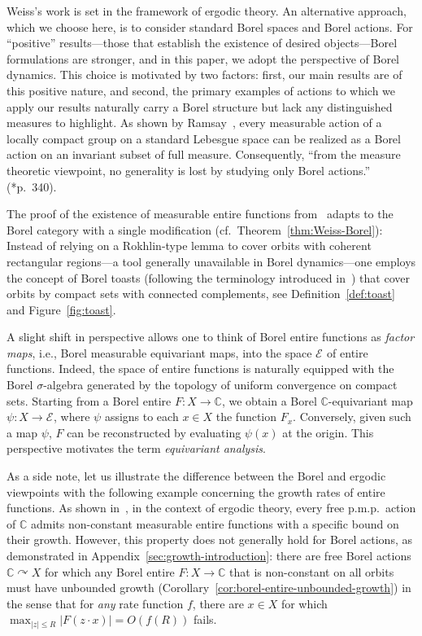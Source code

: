 \documentclass[12pt]{paper}
\numberwithin{equation}{section}
\theoremstyle{plain}
\theoremstyle{definition}
\newcommand{\C}{\mathbb{C}}
\newcommand{\holom}[1][]{\mathcal{E}_{#1}}
\newcommand{\acts}{\curvearrowright}
\begin{document}
Weiss's work is set in the framework of ergodic theory.  An alternative approach, which we choose
here, is to consider standard Borel spaces and Borel actions.  For ``positive'' results---those that
establish the existence of desired objects---Borel formulations are stronger, and in this paper, we
adopt the perspective of Borel dynamics.  This choice is motivated by two factors: first, our main
results are of this positive nature, and second, the primary examples of actions to which we apply
our results naturally carry a Borel structure but lack any distinguished measures to highlight.
As shown by Ramsay~\cite{ramsayMeasurableGroupActions1985}, every measurable action of a locally
compact group on a standard Lebesgue space can be realized as a Borel action on an invariant subset
of full measure. Consequently, ``from the measure theoretic viewpoint, no generality is lost by
studying only Borel actions.'' (\cite{ramsayMeasurableGroupActions1985}*{p.~340}).

The proof of the existence of measurable entire functions from~\cite{MR1422707} adapts to the Borel
category with a single modification (cf.~Theorem~\ref{thm:Weiss-Borel}): Instead of relying
on a Rokhlin-type lemma to cover orbits with coherent rectangular regions---a tool generally
unavailable in Borel dynamics---one employs the concept of Borel toasts (following the terminology
introduced in~\cite{gaoForcingConstructionsCountable2022}) that cover orbits by compact sets with
connected complements, see Definition~\ref{def:toast} and Figure~\ref{fig:toast}.

A slight shift in perspective allows one to think of Borel entire functions as \emph{factor maps},
i.e., Borel measurable equivariant maps, into the space \(\holom\) of entire functions.  Indeed, the
space of entire functions is naturally equipped with the Borel \(\sigma\)-algebra generated by the
topology of uniform convergence on compact sets. Starting from a Borel entire \(F:X\to\C\), we
obtain a Borel \(\C\)-equivariant map \(\psi : X \to \holom\), where \(\psi\) assigns to each
\(x \in X\) the function \(F_x\).  Conversely, given such a map \(\psi\), \(F\) can be reconstructed
by evaluating \(\psi(x)\) at the origin. This perspective motivates the term \emph{equivariant
  analysis}.

As a side note, let us illustrate the difference between the Borel and ergodic viewpoints with the
following example concerning the growth rates of entire functions.  As shown
in~\cites{MR4041104,MR3905607}, in the context of ergodic theory, every free p.m.p.\ action of \(\C\)
admits non-constant measurable entire functions with a specific bound on their growth.  However,
this property does not generally hold for Borel actions, as demonstrated in
Appendix~\ref{sec:growth-introduction}: there are free Borel actions \(\C \acts X\) for which any
Borel entire \(F : X \to \C\) that is non-constant on all orbits must have unbounded growth
(Corollary~\ref{cor:borel-entire-unbounded-growth}) in the sense that for \emph{any} rate function
\(f\), there are \(x\in X\) for which \(\displaystyle{\max_{|z|\le R}|F(z\cdot x)|= O(f(R))}\) fails.
\end{document}
